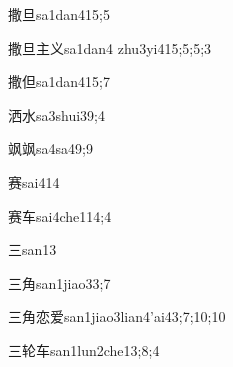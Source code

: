 
\begin{verbete}{撒旦}{sa1dan4}{15;5}
\end{verbete}

\begin{verbete}{撒旦主义}{sa1dan4 zhu3yi4}{15;5;5;3}
\end{verbete}

\begin{verbete}{撒但}{sa1dan4}{15;7}
\end{verbete}

\begin{verbete}{洒水}{sa3shui3}{9;4}
\end{verbete}

\begin{verbete}{飒飒}{sa4sa4}{9;9}
\end{verbete}

\begin{verbete}{赛}{sai4}{14}
\end{verbete}

\begin{verbete}{赛车}{sai4che1}{14;4}
\end{verbete}

\begin{verbete}{三}{san1}{3}
\end{verbete}

\begin{verbete}{三角}{san1jiao3}{3;7}
\end{verbete}

\begin{verbete}{三角恋爱}{san1jiao3lian4'ai4}{3;7;10;10}
\end{verbete}

\begin{verbete}{三轮车}{san1lun2che1}{3;8;4}
\end{verbete}


